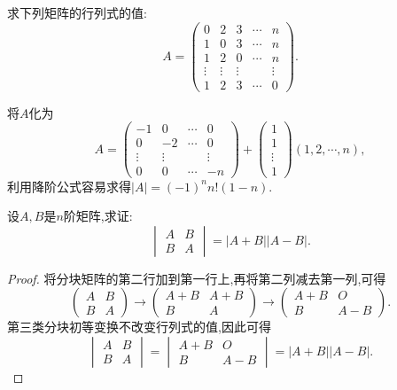 \documentclass[../../main.tex]{subfiles}%
\begin{document}
\begin{example}
求下列矩阵的行列式的值:
\[
A = 
\begin{pmatrix}
0 & 2 & 3 & \cdots & n\\
1 & 0 & 3 & \cdots & n\\
1 & 2 & 0 & \cdots & n\\
\vdots & \vdots & \vdots & & \vdots\\
1 & 2 & 3 & \cdots & 0
\end{pmatrix}.
\]
\end{example}
\begin{solution}

将\(A\)化为
\[
A = 
\begin{pmatrix}
-1 & 0 & \cdots & 0\\
0 & -2 & \cdots & 0\\
\vdots & \vdots & & \vdots\\
0 & 0 & \cdots & -n
\end{pmatrix}
+
\begin{pmatrix}
1\\
1\\
\vdots\\
1
\end{pmatrix}
(1,2,\cdots,n),
\]
利用降阶公式容易求得\(|A| = (-1)^nn!(1 - n)\).

\end{solution}

\begin{proposition}\label{proposition:对角相同分块矩阵行列式计算}
设\(A,B\)是\(n\)阶矩阵,求证:
\[
\begin{vmatrix}
A & B\\
B & A
\end{vmatrix}=|A + B||A - B|.
\]
\end{proposition}
\begin{proof}

将分块矩阵的第二行加到第一行上,再将第二列减去第一列,可得
\[
\begin{pmatrix}
A & B\\
B & A
\end{pmatrix}\to\begin{pmatrix}
A + B & A + B\\
B & A
\end{pmatrix}\to\begin{pmatrix}
A + B & O\\
B & A - B
\end{pmatrix}.
\]
第三类分块初等变换不改变行列式的值,因此可得
\[
\begin{vmatrix}
A & B\\
B & A
\end{vmatrix}=\begin{vmatrix}
A + B & O\\
B & A - B
\end{vmatrix}=|A + B||A - B|.
\]

\end{proof}
\end{document}
